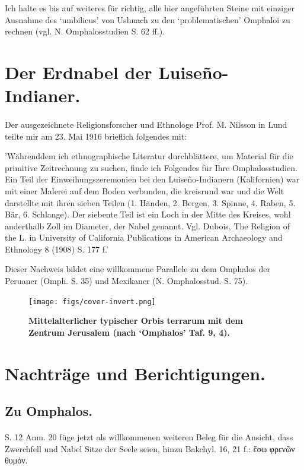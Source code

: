 \documentclass[a4paper, 11pt, oneside]{article}
\begin{document}
Ich halte es bis auf weiteres für richtig, alle hier angeführten Steine mit einziger Ausnahme des `umbilicus' von Ushnach zu den `problematischen' Omphaloi zu rechnen (vgl. N. Omphalosstudien S. 62 ff.).
\clearpage
\section{Der Erdnabel der Luiseño-Indianer.}
\paragraph{}
Der ausgezeichnete Religionsforscher und Ethnologe Prof. M. Nilsson in Lund teilte mir am 23. Mai 1916 brieflich folgendes mit:

'Währenddem ich ethnographische Literatur durchblättere, um Material für die primitive Zeitrechnung zu suchen, finde ich Folgendes für Ihre Omphalosstudien. Ein Teil der Einweihungszeremonien bei den Luiseño-Indianern (Kalifornien) war mit einer Malerei auf dem Boden verbunden, die kreisrund war und die Welt darstellte mit ihren sieben Teilen (1. Händen, 2. Bergen, 3. Spinne, 4. Raben, 5. Bär, 6. Schlange). Der siebente Teil ist ein Loch in der Mitte des Kreises, wohl anderthalb Zoll im Diameter, der Nabel genannt. Vgl. Dubois, The Religion of the L. in University of California Publications in American Archaeology and Ethnology 8 (1908) S. 177 f.'

Dieser Nachweis bildet eine willkommene Parallele zu dem Omphalos der Peruaner (Omph. S. 35) und Mexikaner (N. Omphalosstud. S. 75).

\begin{figure}[H]
\centering
\texttt{[image: figs/cover-invert.png]}
\caption*{\bfseries Mittelalterlicher typischer Orbis terrarum mit dem Zentrum Jerusalem (nach `Omphalos' Taf. 9, 4).}
\end{figure}
\clearpage
\section{Nachträge und Berichtigungen.}
\subsection{Zu Omphalos.}
\paragraph{}
S. 12 Anm. 20 füge jetzt als willkommenen weiteren Beleg für die Ansicht, dass Zwerchfell und Nabel Sitze der Seele seien, hinzu Bakchyl. 16, 21 f.: ἔσω φρενῶν θυμόν.
\end{document}
